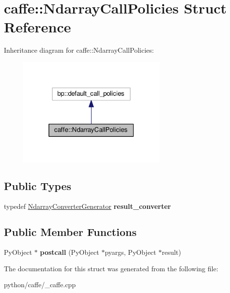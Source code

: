 \hypertarget{structcaffe_1_1_ndarray_call_policies}{}\section{caffe\+:\+:Ndarray\+Call\+Policies Struct Reference}
\label{structcaffe_1_1_ndarray_call_policies}


Inheritance diagram for caffe\+:\+:Ndarray\+Call\+Policies\+:
\nopagebreak
\begin{figure}[H]
\begin{center}
\leavevmode
\includegraphics[width=211pt]{structcaffe_1_1_ndarray_call_policies__inherit__graph}
\end{center}
\end{figure}
\subsection*{Public Types}
\begin{DoxyCompactItemize}
\item 
\mbox{\label{structcaffe_1_1_ndarray_call_policies_a810196d5439d3cede93f73998e1e2236}} 
typedef \mbox{\hyperlink{structcaffe_1_1_ndarray_converter_generator}{Ndarray\+Converter\+Generator}} {\bfseries result\+\_\+converter}
\end{DoxyCompactItemize}
\subsection*{Public Member Functions}
\begin{DoxyCompactItemize}
\item 
\mbox{\label{structcaffe_1_1_ndarray_call_policies_ac1bb77e99e5a2f4bb556e582decf66da}} 
Py\+Object $\ast$ {\bfseries postcall} (Py\+Object $\ast$pyargs, Py\+Object $\ast$result)
\end{DoxyCompactItemize}


The documentation for this struct was generated from the following file\+:\begin{DoxyCompactItemize}
\item 
python/caffe/\+\_\+caffe.\+cpp\end{DoxyCompactItemize}
